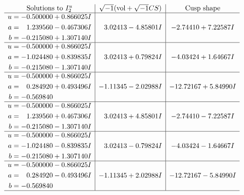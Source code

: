 \documentclass[1p]{elsarticle_modified}
\theoremstyle{definition}
\newcommand{\I}{\sqrt{-1}}
\begin{document}
$$\begin{array}{c|c|c}  
\text{Solutions to }I^u_{2}& \I (\text{vol} + \sqrt{-1}CS) & \text{Cusp shape}\\
 \hline 
\begin{aligned}
u &= -0.500000 + 0.866025 I \\
a &= \phantom{-}1.239560 - 0.467306 I \\
b &= -0.215080 + 1.307140 I\end{aligned}
 & \phantom{-}3.02413 - 4.85801 I & -2.74410 + 7.22587 I \\ \hline\begin{aligned}
u &= -0.500000 + 0.866025 I \\
a &= -1.024480 + 0.839835 I \\
b &= -0.215080 - 1.307140 I\end{aligned}
 & \phantom{-}3.02413 + 0.79824 I & -4.03424 + 1.64667 I \\ \hline\begin{aligned}
u &= -0.500000 + 0.866025 I \\
a &= \phantom{-}0.284920 + 0.493496 I \\
b &= -0.569840\phantom{ +0.000000I}\end{aligned}
 & -1.11345 - 2.02988 I & -12.72167 + 5.84990 I \\ \hline\begin{aligned}
u &= -0.500000 - 0.866025 I \\
a &= \phantom{-}1.239560 + 0.467306 I \\
b &= -0.215080 - 1.307140 I\end{aligned}
 & \phantom{-}3.02413 + 4.85801 I & -2.74410 - 7.22587 I \\ \hline\begin{aligned}
u &= -0.500000 - 0.866025 I \\
a &= -1.024480 - 0.839835 I \\
b &= -0.215080 + 1.307140 I\end{aligned}
 & \phantom{-}3.02413 - 0.79824 I & -4.03424 - 1.64667 I \\ \hline\begin{aligned}
u &= -0.500000 - 0.866025 I \\
a &= \phantom{-}0.284920 - 0.493496 I \\
b &= -0.569840\phantom{ +0.000000I}\end{aligned}
 & -1.11345 + 2.02988 I & -12.72167 - 5.84990 I\\
 \hline 
 \end{array}$$\newpage
\end{document}
